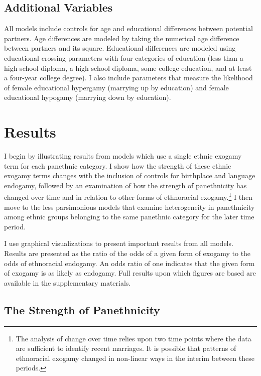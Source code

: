\documentclass[11pt,]{article}
\begin{document}
\hypertarget{additional-variables}{%
\subsection{Additional Variables}\label{additional-variables}}

All models include controls for age and educational differences between potential partners. Age differences are modeled by taking the numerical age difference between partners and its square. Educational differences are modeled using educational crossing parameters \citep{schwartz_trends_2005} with four categories of education (less than a high school diploma, a high school diploma, some college education, and at least a four-year college degree). I also include parameters that measure the likelihood of female educational hypergamy (marrying up by education) and female educational hypogamy (marrying down by education).

\hypertarget{results}{%
\section{Results}\label{results}}

I begin by illustrating results from models which use a single ethnic exogamy term for each panethnic category. I show how the strength of these ethnic exogamy terms changes with the inclusion of controls for birthplace and language endogamy, followed by an examination of how the strength of panethnicity has changed over time and in relation to other forms of ethnoracial exogamy.\footnote{The analysis of change over time relies upon two time points where the data are sufficient to identify recent marriages. It is possible that patterns of ethnoracial exogamy changed in non-linear ways in the interim between these periods.} I then move to the less parsimonious models that examine heterogeneity in panethnicity among ethnic groups belonging to the same panethnic category for the later time period.

I use graphical visualizations to present important results from all models. Results are presented as the ratio of the odds of a given form of exogamy to the odds of ethnoracial endogamy. An odds ratio of one indicates that the given form of exogamy is as likely as endogamy. Full results upon which figures are based are available in the supplementary materials.

\hypertarget{the-strength-of-panethnicity}{%
\subsection{The Strength of Panethnicity}\label{the-strength-of-panethnicity}}
\end{document}
